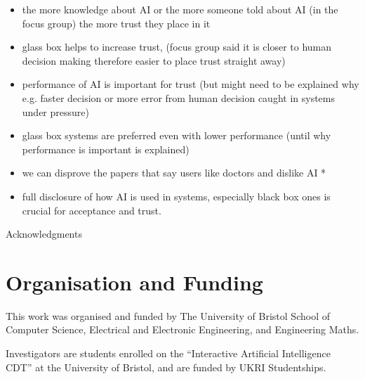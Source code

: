 \documentclass[manuscript,screen,review]{acmart}
\begin{document}
\begin{itemize}
    \item the more knowledge about AI or the more someone told about AI (in the focus group) the more trust they place in it
    \item glass box helps to increase trust, (focus group said it is closer to human decision making therefore easier to place trust straight away)
    \item performance of AI is important for trust (but might need to be explained why e.g. faster decision or more error from human decision caught in systems under pressure)
    \item glass box systems are preferred even with lower performance (until why performance is important is explained)
    \item we can disprove the papers that say users like doctors and dislike AI *
    \item full disclosure of how AI is used in systems, especially black box ones is crucial for acceptance and trust.
\end{itemize}



\begin{acks}
Acknowledgments
\end{acks}

\newpage



\appendix


\section{Organisation and Funding}


This work was organised and funded by The University of Bristol School of Computer Science, Electrical and Electronic Engineering, and Engineering Maths.

Investigators are students enrolled on the “Interactive Artificial Intelligence CDT” at the University of Bristol, and are funded by UKRI Studentships.
\end{document}
